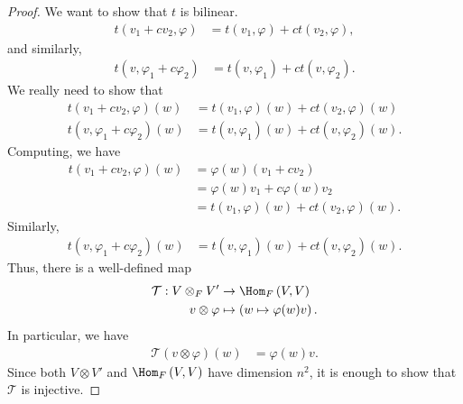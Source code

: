 \documentclass[10pt]{mypackage}
\begin{document}
\begin{proof}
    We want to show that $t$ is bilinear.
    \begin{align*}
      t\left(v_1 + cv_2,\varphi\right) &= t\left(v_1,\varphi\right) + ct\left(v_2,\varphi\right),
    \end{align*}
    and similarly,
    \begin{align*}
      t\left(v,\varphi_1 + c\varphi_2\right) &= t\left(v,\varphi_1\right) + ct\left(v,\varphi_2\right).
    \end{align*}
    We really need to show that
    \begin{align*}
      t\left(v_1 + cv_2,\varphi\right)\left(w\right) &= t\left(v_1,\varphi\right)\left(w\right) + ct\left(v_2,\varphi\right)\left(w\right)\\
      t\left(v,\varphi_1 + c\varphi_2\right)\left(w\right) &= t\left(v,\varphi_1\right)\left(w\right) + ct\left(v,\varphi_2\right)\left(w\right).
    \end{align*}
    Computing, we have
    \begin{align*}
      t\left(v_1 + cv_2,\varphi\right)\left(w\right) &= \varphi\left(w\right)\left(v_1 + cv_2\right)\\
                                                      &= \varphi\left(w\right)v_1 + c\varphi\left(w\right)v_2\\
                                                      &= t\left(v_1,\varphi\right)\left(w\right) + ct\left(v_2,\varphi\right)\left(w\right).
    \end{align*}
    Similarly,
    \begin{align*}
      t\left(v,\varphi_1 + c\varphi_2\right)\left(w\right) &= t\left(v,\varphi_1\right)\left(w\right) + ct\left(v,\varphi_2\right)\left(w\right).
    \end{align*}
    Thus, there is a well-defined map 
    \begin{align*}
      \mathcal{T}: V\otimes_{F}V' &\rightarrow \Hom_{F}\left(V,V\right)\\
      v\otimes \varphi &\mapsto \left(w\mapsto \varphi(w) v\right).
    \end{align*}
    In particular, we have
    \begin{align*}
      \mathcal{T}\left(v\otimes \varphi\right)\left(w\right) &= \varphi\left(w\right)v.
    \end{align*}
    Since both $V\otimes V'$ and $\Hom_{F}\left(V,V\right)$ have dimension $n^2$, it is enough to show that $\mathcal{T}$ is injective.\newline


\end{proof}
\end{document}
